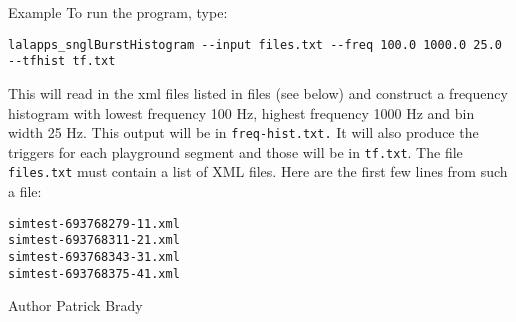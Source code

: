 \begin{entry}
\item[Example]
To run the program,  type:
\begin{verbatim}
lalapps_snglBurstHistogram --input files.txt --freq 100.0 1000.0 25.0 --tfhist tf.txt
\end{verbatim}
This will read in the xml files listed in files (see below) and
construct a frequency histogram with lowest frequency 100 Hz,  highest
frequency 1000 Hz and bin width 25 Hz. This output will be in \verb$freq-hist.txt.$
It will also produce the triggers for each playground segment and those will be in \verb$tf.txt$.  The file \verb$files.txt$
must contain a list of XML files.  Here are the first few lines from
such a file:
\begin{verbatim}
simtest-693768279-11.xml
simtest-693768311-21.xml
simtest-693768343-31.xml
simtest-693768375-41.xml
\end{verbatim}

\item[Author]
Patrick Brady

\end{entry}
